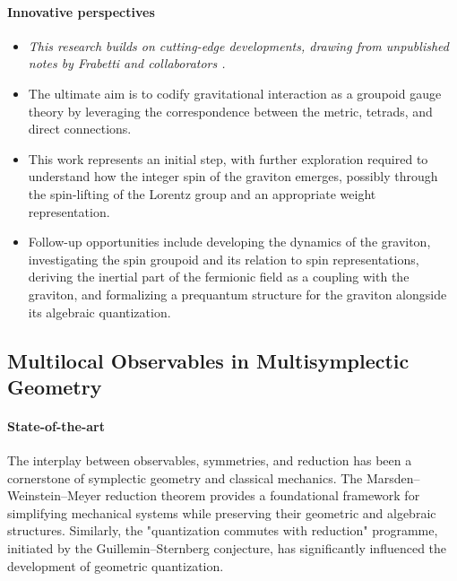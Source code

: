 \documentclass[a4paper]{article}
\begin{document}
\paragraph{Innovative perspectives}

\begin{itemize}[noitemsep, topsep=0pt, parsep=0pt, partopsep=0pt]
    \item \it This research builds on cutting-edge developments, drawing from unpublished notes by Frabetti and collaborators \cite{Azzali2022}.
    \item The ultimate aim is to codify gravitational interaction as a groupoid gauge theory by leveraging the correspondence between the metric, tetrads, and direct connections.
    \item This work represents an initial step, with further exploration required to understand how the integer spin of the graviton emerges, possibly through the spin-lifting of the Lorentz group and an appropriate weight representation.
    \item Follow-up opportunities include developing the dynamics of the graviton, investigating the spin groupoid and its relation to spin representations, deriving the inertial part of the fermionic field as a coupling with the graviton, and formalizing a prequantum structure for the graviton alongside its algebraic quantization.
\end{itemize}




\subsection{Multilocal Observables in Multisymplectic Geometry}
\label{wp:MultiLocObs}

\paragraph{State-of-the-art}

The interplay between observables, symmetries, and reduction has been a cornerstone of symplectic geometry and classical mechanics. The Marsden–Weinstein–Meyer reduction theorem provides a foundational framework for simplifying mechanical systems while preserving their geometric and algebraic structures. Similarly, the "quantization commutes with reduction" programme, initiated by the Guillemin–Sternberg conjecture, has significantly influenced the development of geometric quantization.
\end{document}
